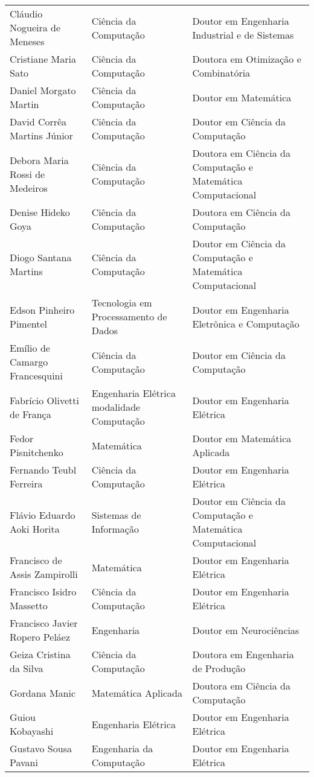 {\begin{longtable}{|p{}|p{}|p{}|}
    Cláudio Nogueira de Meneses & Ciência da Computação & Doutor em Engenharia Industrial e de Sistemas \\
    Cristiane Maria Sato & Ciência da Computação & Doutora em Otimização e Combinatória \\
    Daniel Morgato Martin & Ciência da Computação & Doutor em Matemática \\
    David Corrêa Martins Júnior & Ciência da Computação & Doutor em Ciência da Computação \\
    Debora Maria Rossi de Medeiros & Ciência da Computação & Doutora em Ciência da Computação e Matemática Computacional \\
    Denise Hideko Goya & Ciência da Computação & Doutora em Ciência da Computação \\
    Diogo Santana Martins & Ciência da Computação & Doutor em Ciência da Computação e Matemática Computacional \\
    Edson Pinheiro Pimentel & Tecnologia em Processamento de Dados & Doutor em Engenharia Eletrônica e Computação \\
    Emílio de Camargo Francesquini & Ciência da Computação & Doutor em Ciência da Computação \\
    Fabrício Olivetti de França & Engenharia Elétrica modalidade Computação & Doutor em Engenharia Elétrica \\
    Fedor Pisnitchenko & Matemática & Doutor em Matemática Aplicada \\
    Fernando Teubl Ferreira & Ciência da Computação & Doutor em Engenharia Elétrica \\
    Flávio Eduardo Aoki Horita & Sistemas de Informação & Doutor em Ciência da Computação e Matemática Computacional \\
    Francisco de Assis Zampirolli & Matemática & Doutor em Engenharia Elétrica \\
    Francisco Isidro Massetto & Ciência da Computação & Doutor em Engenharia Elétrica \\
    Francisco Javier Ropero Peláez & Engenharia & Doutor em Neurociências \\
    Geiza Cristina da Silva & Ciência da Computação & Doutora em Engenharia de Produção \\
    Gordana Manic & Matemática Aplicada & Doutora em Ciência da Computação \\
    Guiou Kobayashi & Engenharia Elétrica & Doutor em Engenharia Elétrica \\
    Gustavo Sousa Pavani & Engenharia da Computação & Doutor em Engenharia Elétrica \\

\end{longtable}}
